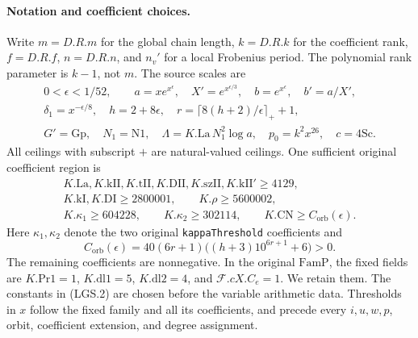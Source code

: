 \paragraph{Notation and coefficient choices.}
Write \(m=D.R.m\) for the global chain length, \(k=D.R.k\) for the
coefficient rank, \(f=D.R.f\), \(n=D.R.n\), and \(n_v'\) for a local
Frobenius period.  The polynomial rank parameter is \(k-1\), not \(m\).
The source scales are
\[
 \begin{gathered}
 0<\epsilon<1/52,\qquad
 a=xe^{x^\epsilon},\quad X'=e^{x^{\epsilon/3}},
 \quad b=e^{x^\epsilon},\quad b'=a/X',\\
 \delta_1=x^{-\epsilon/8},\quad h=2+8\epsilon,\quad
 r=\lceil8(h+2)/\epsilon\rceil_++1,\\
 G'=\mathrm{Gp},\quad N_1=\mathrm{N1},\quad
 \Lambda=K.\mathrm{La}\,N_1^2\log a,\quad
 p_0=k^2x^{26},\quad c=4\mathrm{Sc}.
 \end{gathered}                                                   \tag{LGS.1}
\]
All ceilings with subscript \(+\) are natural-valued ceilings.
One sufficient original coefficient region is
\[
 \begin{gathered}
 K.\mathrm{La},K.\mathrm{kII},K.\mathrm{tII},
 K.\mathrm{DII},K.\mathrm{szII},K.\mathrm{kII}'\ge4129,\\
 K.\mathrm{kI},K.\mathrm{DI}\ge2800001,\qquad
 K.\rho\ge5600002,\\
 K.\kappa_1\ge604228,\qquad K.\kappa_2\ge302114,
 \qquad K.\mathrm{CN}\ge C_{\mathrm{orb}}(\epsilon).
 \end{gathered}                                                   \tag{LGS.2}
\]
Here \(\kappa_1,\kappa_2\) denote the two original
\texttt{kappaThreshold} coefficients and
\[
 C_{\mathrm{orb}}(\epsilon)
   =40(6r+1)\bigl((h+3)10^{6r+1}+6\bigr)>0.             \tag{LGS.3}
\]
The remaining coefficients are nonnegative.  In the original
\(\mathrm{FamP}\), the fixed fields are
\(K.\mathrm{Pr1}=1\), \(K.\mathrm{dl1}=5\),
\(K.\mathrm{dl2}=4\), and \(\mathcal F.cX.C_e=1\).
We retain them.  The constants in (LGS.2) are chosen before the
variable arithmetic data.  Thresholds in \(x\) follow the fixed
family and all its coefficients, and precede every \(i,u,w,p\),
orbit, coefficient extension, and degree assignment.

